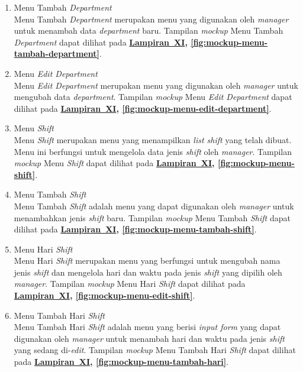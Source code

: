 \begin{enumerate}
    \item Menu Tambah \textit{Department}
    \\ Menu Tambah \textit{Department} merupakan menu yang digunakan oleh \textit{manager} untuk menambah data \textit{department} baru. Tampilan \textit{mockup} Menu Tambah \textit{Department} dapat dilihat pada \textbf{\hyperref[sec:mockup-aplikasi-presensi-online]{Lampiran~XI}, \ref{fig:mockup-menu-tambah-department}}.

    \item Menu \textit{Edit Department}
    \\ Menu \textit{Edit Department} merupakan menu yang digunakan oleh \textit{manager} untuk mengubah data \textit{department}. Tampilan \textit{mockup} Menu \textit{Edit Department} dapat dilihat pada \textbf{\hyperref[sec:mockup-aplikasi-presensi-online]{Lampiran~XI}, \ref{fig:mockup-menu-edit-department}}.

    \item Menu \textit{Shift}
    \\ Menu \textit{Shift} merupakan menu yang menampilkan \textit{list shift} yang telah dibuat. Menu ini berfungsi untuk mengelola data jenis \textit{shift} oleh \textit{manager}. Tampilan \textit{mockup} Menu \textit{Shift} dapat dilihat pada \textbf{\hyperref[sec:mockup-aplikasi-presensi-online]{Lampiran~XI}, \ref{fig:mockup-menu-shift}}. 

    \item Menu Tambah \textit{Shift}
    \\ Menu Tambah \textit{Shift} adalah menu yang dapat digunakan oleh \textit{manager} untuk menambahkan jenis \textit{shift} baru. Tampilan \textit{mockup} Menu Tambah \textit{Shift} dapat dilihat pada \textbf{\hyperref[sec:mockup-aplikasi-presensi-online]{Lampiran~XI}, \ref{fig:mockup-menu-tambah-shift}}.

    \item Menu Hari \textit{Shift}
    \\ Menu Hari \textit{Shift} merupakan menu yang berfungsi untuk mengubah nama jenis \textit{shift} dan mengelola hari dan waktu pada jenis \textit{shift} yang dipilih oleh \textit{manager}. Tampilan \textit{mockup} Menu Hari \textit{Shift} dapat dilihat pada \textbf{\hyperref[sec:mockup-aplikasi-presensi-online]{Lampiran~XI}, \ref{fig:mockup-menu-edit-shift}}.

    \item Menu Tambah Hari \textit{Shift}
    \\ Menu Tambah Hari \textit{Shift} adalah menu yang berisi \textit{input form} yang dapat digunakan oleh \textit{manager} untuk menambah hari dan waktu pada jenis \textit{shift} yang sedang di-\textit{edit}. Tampilan \textit{mockup} Menu Tambah Hari \textit{Shift} dapat dilihat pada \textbf{\hyperref[sec:mockup-aplikasi-presensi-online]{Lampiran~XI}, \ref{fig:mockup-menu-tambah-hari}}.


\end{enumerate}
